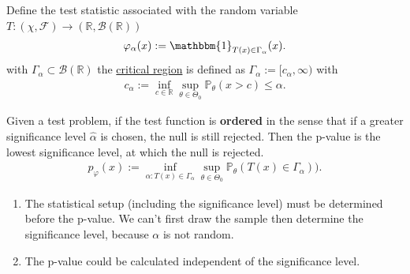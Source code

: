 \begin{method}
Define the test statistic associated with the random variable $T: (\chi, \mathcal{F}) \rightarrow (\mathbb{R}, \mathcal{B}(\mathbb{R})) $
\begin{align*}
	\varphi_\alpha (x) := \mathbbm{1}_{T(x) \in \Gamma_\alpha}(x). 
\end{align*}
with $\Gamma_\alpha \subset \mathcal{B}(\mathbb{R})$ the \underline{critical region} is defined as $\Gamma_\alpha:= [c_\alpha, \infty)$ with 
\begin{align*}
	c_\alpha:= \inf_{c \in \mathbb{R}} \sup_{\theta \in \Theta_0} \mathbb{P}_\theta( x > c) \le \alpha. 
\end{align*}
\end{method}

\begin{definition}[p-value]
Given a test problem, if the test function is \textbf{ordered} in the sense that if a greater significance level $\hat{\alpha}$ is chosen, the null is still rejected. Then the p-value is the lowest significance level, at which the null is rejected.
\begin{align*}
	p_\varphi(x):= \inf_{\alpha: T(x) \in \Gamma_\alpha} \sup_{\theta \in \Theta_0} \mathbb{P}_\theta(T(x) \in \Gamma_\alpha)).
\end{align*}
\end{definition}
\begin{remark}
\quad
\begin{enumerate}
    \item The statistical setup (including the significance level) must be determined before the p-value. We can't first draw the sample then determine the significance level, because $\alpha$ is not random. 
    \item The p-value could be calculated independent of the significance level.
\end{enumerate}
\end{remark}

